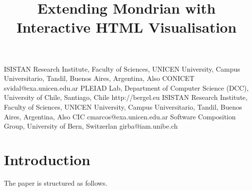\documentclass[preprint,10pt]{sigplanconf}
\newcommand{\seclabel}[1]{\label{sec:#1}}
\newcommand{\secref}[1]{Section~\ref{sec:#1}\xspace}
\begin{document}

\title{Extending Mondrian with Interactive HTML Visualisation}

	{ISISTAN Research Institute, Faculty of Sciences, UNICEN University, Campus Universitario, Tandil, Buenos Aires, Argentina, Also CONICET}
	{svidal@exa.unicen.edu.ar}
	{PLEIAD Lab, Department of Computer Science (DCC), University of Chile, Santiago, Chile}
	{http://bergel.eu}
	{ISISTAN Research Institute, Faculty of Sciences, UNICEN University, Campus Universitario, Tandil, Buenos Aires, Argentina, Also CIC}
	{cmarcos@exa.unicen.edu.ar}
	{Software Composition Group, University of Bern, Switzerlan}
	{girba@iam.unibe.ch}


\maketitle


\begin{abstract}
\end{abstract}

\section{Introduction}\seclabel{introduction}






The paper is structured as follows.


%
\end{document}
